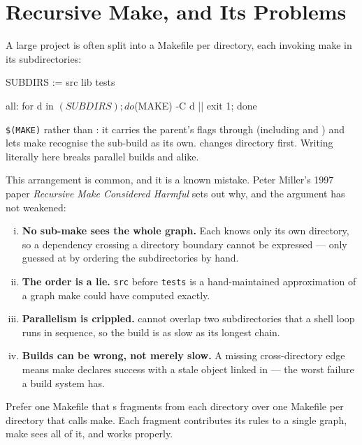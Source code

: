 \section{Recursive Make, and Its Problems}\label{sec:mk-recursive}

A large project is often split into a Makefile per directory, each invoking make
in its subdirectories:

\begin{makecode}
SUBDIRS := src lib tests

all:
    for d in $(SUBDIRS); do $(MAKE) -C $$d || exit 1; done
\end{makecode}

\begin{note}
	\texttt{\$(MAKE)} rather than : it carries the parent's flags through
	(including  and ) and lets make recognise the sub-build as its
	own.  changes directory first. Writing  literally here
	breaks parallel builds and  alike.
\end{note}

This arrangement is common, and it is a known mistake. Peter Miller's 1997
paper \emph{Recursive Make Considered Harmful} \cite{miller1998recursive} sets
out why, and the argument has not weakened:

\begin{enumerate}[(i)]
	\item \textbf{No sub-make sees the whole graph.} Each knows only its own
	      directory, so a dependency crossing a directory boundary cannot be expressed
	      --- only guessed at by ordering the subdirectories by hand.
	\item \textbf{The order is a lie.} \texttt{src} before \texttt{tests} is a
	      hand-maintained approximation of a graph make could have computed exactly.
	\item \textbf{Parallelism is crippled.}  cannot overlap two
	      subdirectories that a shell  loop runs in sequence, so the build is
	      as slow as its longest chain.
	\item \textbf{Builds can be wrong, not merely slow.} A missing cross-directory
	      edge means make declares success with a stale object linked in --- the worst
	      failure a build system has.
\end{enumerate}

\begin{moral}
	Prefer one Makefile that s fragments from each directory over one
	Makefile per directory that calls make. Each fragment contributes its rules to
	a single graph, make sees all of it, and  works properly.
\end{moral}

